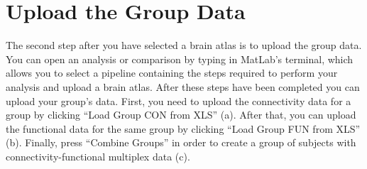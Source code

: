 \documentclass[justified]{tufte-handout}
\begin{document}
\section{Upload the Group Data}

The second step after you have selected a brain atlas is to upload the group data. You can open an analysis or comparison by typing  in MatLab's terminal, which allows you to select a pipeline containing the steps required to perform your analysis and upload a brain atlas. After these steps have been completed you can upload your group's data. First, you need to upload the connectivity data for a group by clicking ``Load Group CON from XLS'' (a). After that, you can upload the functional data for the same group by clicking ``Load Group FUN from XLS'' (b). Finally, press ``Combine Groups'' in order to create a group of subjects with connectivity-functional multiplex data (c).
\end{document}
